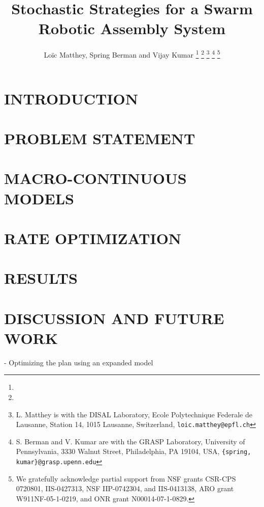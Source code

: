 \documentclass[a4paper, 10pt, conference]{ieeeconf}      %
\title{\LARGE \bf Stochastic Strategies for a Swarm Robotic Assembly System}
\author{Lo\"ic Matthey, Spring Berman and Vijay Kumar%
\thanks{}%
\thanks{
       {\tt\small }}%
\thanks{L. Matthey is with the DISAL Laboratory, Ecole Polytechnique Federale de Lausanne, Station 14, 1015 Lausanne, Switzerland,
{\tt\small loic.matthey@epfl.ch}}
\thanks{S. Berman and V. Kumar are with the GRASP Laboratory, University of Pennsylvania, 3330 Walnut Street, Philadelphia, PA 19104, USA,
       {\tt\small \{spring, kumar\}@grasp.upenn.edu}}
\thanks{We gratefully acknowledge partial support from NSF grants CSR-CPS
0720801, IIS-0427313, NSF IIP-0742304, and IIS-0413138, ARO grant
W911NF-05-1-0219, and ONR grant N00014-07-1-0829.} }
\begin{document}
\maketitle
\thispagestyle{empty}
\pagestyle{empty}


\begin{abstract}


\end{abstract}


\section{INTRODUCTION}
   

\section{PROBLEM STATEMENT}
   

\section{MACRO-CONTINUOUS MODELS}
   

\section{RATE OPTIMIZATION}\label{sec:optimization}
   

\section{RESULTS}
	

\section{DISCUSSION AND FUTURE WORK}


- Optimizing the plan using an expanded model



\end{document}
